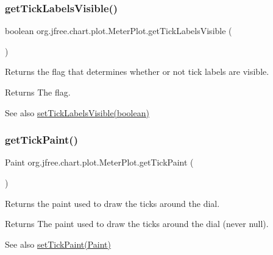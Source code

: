 \subsubsection{\texorpdfstring{get\+Tick\+Labels\+Visible()}{getTickLabelsVisible()}}
{\footnotesize\ttfamily boolean org.\+jfree.\+chart.\+plot.\+Meter\+Plot.\+get\+Tick\+Labels\+Visible (\begin{DoxyParamCaption}{ }\end{DoxyParamCaption})}

Returns the flag that determines whether or not tick labels are visible.

\begin{DoxyReturn}{Returns}
The flag.
\end{DoxyReturn}
\begin{DoxySeeAlso}{See also}
\mbox{\hyperlink{classorg_1_1jfree_1_1chart_1_1plot_1_1_meter_plot_ae3aee668c150efd7e0f7b0f748e4472e}{set\+Tick\+Labels\+Visible(boolean)}} 
\end{DoxySeeAlso}
\mbox{\label{classorg_1_1jfree_1_1chart_1_1plot_1_1_meter_plot_a3db1e7fc277e356f202e2f4ce5730c12}} 
\subsubsection{\texorpdfstring{get\+Tick\+Paint()}{getTickPaint()}}
{\footnotesize\ttfamily Paint org.\+jfree.\+chart.\+plot.\+Meter\+Plot.\+get\+Tick\+Paint (\begin{DoxyParamCaption}{ }\end{DoxyParamCaption})}

Returns the paint used to draw the ticks around the dial.

\begin{DoxyReturn}{Returns}
The paint used to draw the ticks around the dial (never {\ttfamily null}).
\end{DoxyReturn}
\begin{DoxySeeAlso}{See also}
\mbox{\hyperlink{classorg_1_1jfree_1_1chart_1_1plot_1_1_meter_plot_a97ca193d5f4d6c1e4e291798b5b5ba74}{set\+Tick\+Paint(\+Paint)}} 
\end{DoxySeeAlso}
\mbox{\label{classorg_1_1jfree_1_1chart_1_1plot_1_1_meter_plot_a14d55a550f52b6faba78c7cfd2d84683}} 
